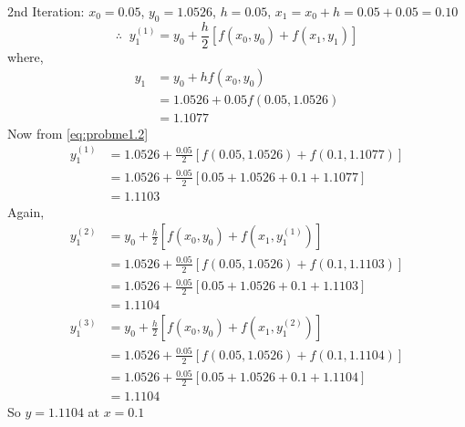 \documentclass[../main-sheet.tex]{subfiles}
\begin{document}
\begin{soln}
    
    2nd Iteration: \(x_0=0.05\), \(y_0=1.0526\), \(h=0.05\), \(x_1=x_0+h=0.05+0.05=0.10\)\\
    \begin{equation}
        \therefore\;\;y_{1}^{(1)}=y_0+\frac{h}{2}\left[ f(x_0,y_0)+f(x_{1},y_{1})\right]
        \label{eq:probme1.2}
    \end{equation}
    where,
    \begin{align*}
        y_1&=y_0+hf(x_0,y_0)\\
        &=1.0526+0.05f(0.05,1.0526)\\
        &=1.1077
    \end{align*}
    Now from \eqref{eq:probme1.2}
    \begin{align*}
        y_1^{(1)}&=1.0526+\frac{0.05}{2}\left[ f(0.05,1.0526)+f(0.1,1.1077)\right]\\
        &=1.0526+\frac{0.05}{2}\left[ 0.05+1.0526+0.1+1.1077\right]\\
        &=1.1103
    \end{align*}
    Again,
    \begin{align*}
        y_1^{(2)}&=y_0+\frac{h}{2}\left[ f(x_0,y_0)+f(x_{1},y_{1}^{(1)})\right]\\
        &=1.0526+\frac{0.05}{2}\left[ f(0.05,1.0526)+f(0.1,1.1103)\right]\\
        &=1.0526+\frac{0.05}{2}\left[ 0.05+1.0526+0.1+1.1103\right]\\
        &=1.1104
    \end{align*}
    \begin{align*}
        y_1^{(3)}&=y_0+\frac{h}{2}\left[ f(x_0,y_0)+f(x_{1},y_{1}^{(2)})\right]\\
        &=1.0526+\frac{0.05}{2}\left[ f(0.05,1.0526)+f(0.1,1.1104)\right]\\
        &=1.0526+\frac{0.05}{2}\left[ 0.05+1.0526+0.1+1.1104\right]\\
        &=1.1104
    \end{align*}
    So \(y=1.1104\) at \(x=0.1\)
\end{soln}
\end{document}
